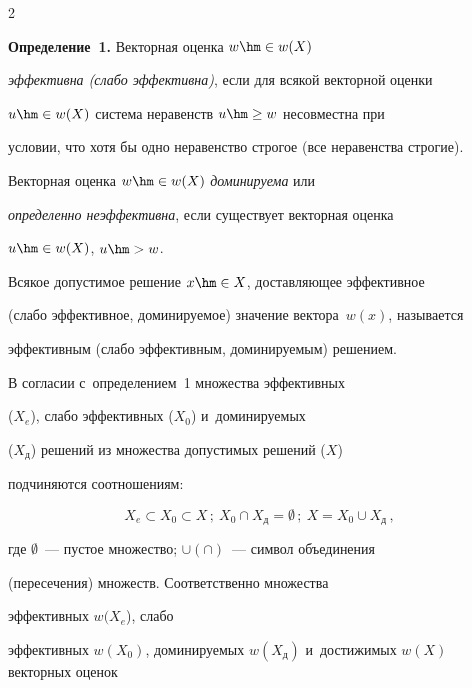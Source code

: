 \begin{multicols}{2}





\smallskip





\noindent


  \textbf{Определение~1.} Векторная оценка $w\hm\in w(X)$ 


\textit{эффективна (слабо эффективна)}, если для всякой векторной оценки 


$u\hm\in w(X)$ сис\-те\-ма неравенств $u\hm\geq w$ несовместна при 


условии, что хотя бы одно неравенство строгое (все неравенства строгие).


  


  Векторная оценка $w\hm\in w(X)$ \textit{доминируема} или 


\textit{определенно неэффективна}, если существует векторная оценка 


$u\hm\in w(X)$, $u\hm> w$.


  


  Всякое допустимое решение $x\hm\in X$, доставляющее эффективное 


(слабо эффективное, доминируемое) значение вектора~$w(x)$, называется 


эффективным (слабо эффективным, доминируемым) \mbox{решением}.


  


  В согласии с~определением~1 множества эффективных 


($X_{e}$), слабо эффективных ($X_0$) и~доминируемых 


($X_{\mathrm{д}}$) решений из множества допустимых решений ($X$) 


подчиняются соотношениям:


  $$


  X_{e}\subset X_0\subset X\,;\ X_0\cap 


X_{\mathrm{д}}=\emptyset\,;\ X=X_0\cup X_{\mathrm{д}}\,,


  $$


где $\emptyset$~--- пустое множество; $\cup (\cap)$~--- символ объединения 


(пересечения) множеств. Соответственно множества 


  эффективных $w(X_{e}$), слабо 


эффективных $w(X_0)$, доминируемых $w(X_{\mathrm{д}})$ и~достижимых  $w(X)$ векторных оценок 



\end{multicols}
